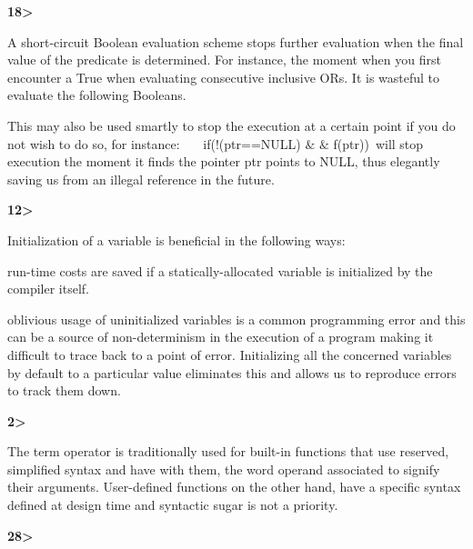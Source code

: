 \documentclass[12pt]{article}
\renewcommand{\_}{\kern-1.5pt\textunderscore\kern-1.5pt}
\begin{document}
\vspace{\baselineskip}

\vspace{\baselineskip}
\textbf{18>}\par

A short-circuit Boolean evaluation scheme stops further evaluation when the final value of the predicate is determined. For instance, the moment when you first encounter a True when evaluating consecutive inclusive ORs. It is wasteful to evaluate the following Booleans. \par

This may also be used smartly to stop the execution at a certain point if you do not wish to do so, for instance: \ \ \  if(!(ptr==NULL) $\&$ $\&$  f(ptr))\   will stop execution the moment it finds the pointer ptr points to NULL, thus elegantly saving us from an illegal reference in the future.\par


\vspace{\baselineskip}

\vspace{\baselineskip}
\textbf{12>}\par

Initialization of a variable is beneficial in the following ways:\par

run-time costs are saved if a statically-allocated variable is initialized by the compiler itself.\par

oblivious usage of uninitialized variables is a common programming error and this can be a source of non-determinism in the execution of a program making it difficult to trace back to a point of error. Initializing all the concerned variables by default to a particular value eliminates this and allows us to reproduce errors to track them down. \par


\vspace{\baselineskip}
\textbf{2>}\par

The term operator is traditionally used for built-in functions that use reserved, simplified syntax and have with them, the word operand associated to signify their arguments. User-defined functions on the other hand, have a specific syntax defined at design time and syntactic sugar is not a priority.\par


\vspace{\baselineskip}
\textbf{28>}\par
\end{document}
